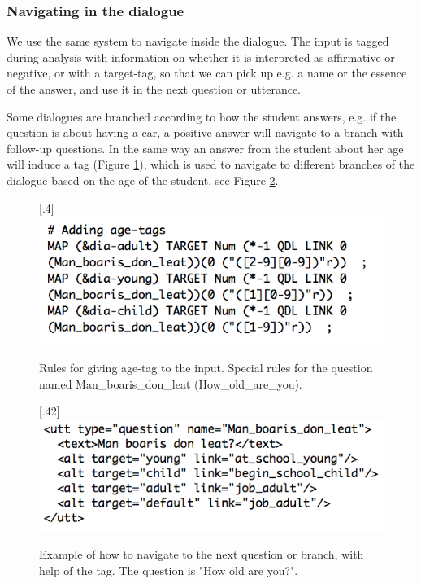 \documentclass[11pt]{article}
\begin{document}
\subsubsection{Navigating in the dialogue}\label{navigation}
We use the same system to navigate inside the dialogue. The input is tagged during analysis with information on whether it is interpreted as affirmative or negative, or with a target-tag, so that we can pick up e.g. a name or the essence of the answer, and use it in the next question or utterance. 

Some dialogues are branched according to how the student answers, e.g. if the question is about having a car, a positive answer will navigate to a branch with follow-up questions. In the same way an answer from the student about her age will induce a tag (Figure \ref{age}), which is used to navigate to different branches of the dialogue based on the age of the student, see Figure \ref{branch}.


\begin{figure}[htbp]
\begin{center}
\scalebox{.4}[.4]{\includegraphics{presentation/img/picking_age2.png}}\\
\caption{Rules for giving age-tag to the input. Special rules for the question named Man\_boaris\_don\_leat (How\_old\_are\_you).}
\label{age}
\end{center}
\end{figure}


\begin{figure}[htbp]
\begin{center}
\scalebox{.42}[.42]{\includegraphics{presentation/img/Man_boarisEng.png}}\\
\caption{Example of how to navigate to the next question or branch, with help of the tag. The question is "How old are you?".}
\label{branch}
\end{center}
\end{figure}
\end{document}
